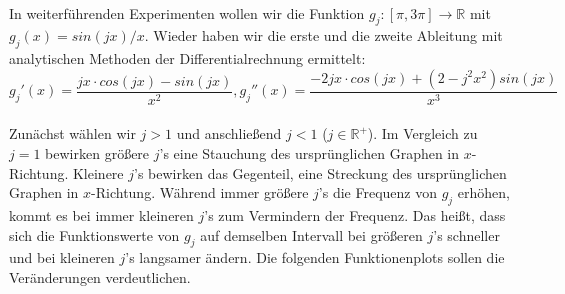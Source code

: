 \documentclass{scrartcl}
\begin{document}
 \\
In weiterführenden Experimenten wollen wir die Funktion $g_j:[\pi, 3\pi] \rightarrow \mathbb{R}$ mit $g_j(x) = sin(j x)/x$. Wieder haben wir die erste und die zweite Ableitung mit analytischen Methoden der Differentialrechnung ermittelt: \\
\[g_j'(x) = \frac{jx \cdot cos(jx) - sin(jx)}{x^{2}}, g_j''(x) = \frac{-2jx \cdot cos(jx) + (2-j^{2}x^{2}) sin(jx)}{x^{3}} \] \\
Zunächst wählen wir $j>1$ und anschließend $j<1$ ($j \in \mathbb{R^{+}}$). Im Vergleich zu $j = 1$ bewirken größere $j$'s eine Stauchung des ursprünglichen Graphen in $x$-Richtung. Kleinere $j$'s bewirken das Gegenteil, eine Streckung des ursprünglichen Graphen in $x$-Richtung. Während immer größere $j$'s die Frequenz von $g_j$ erhöhen, kommt es bei immer kleineren $j$'s zum Vermindern der Frequenz. Das heißt, dass sich die Funktionswerte von $g_j$ auf demselben Intervall bei größeren $j$'s schneller und bei kleineren $j$'s langsamer ändern. Die folgenden Funktionenplots sollen die Veränderungen verdeutlichen.
\end{document}

